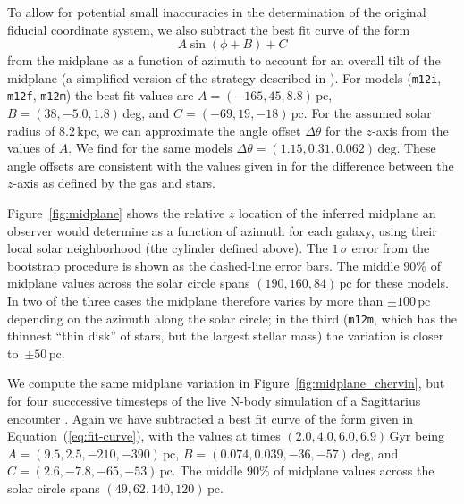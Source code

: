 \documentclass[twocolumn]{aastex62}
\newcommand{\pc}{\text{pc}}
\newcommand{\kpc}{\text{kpc}}
\newcommand{\Gyr}{\text{Gyr}}
\newcommand{\mi}{\texttt{m12i}}
\newcommand{\mf}{\texttt{m12f}}
\newcommand{\mm}{\texttt{m12m}}
\newcommand{\beq}{\begin{equation}}
\newcommand{\eeq}{\end{equation}}
\begin{document}
To allow for potential small inaccuracies in the determination of the original
fiducial coordinate system, we also subtract the best fit curve of the form 
\beq \label{eq:fit-curve}
A \sin{\left(\phi + B\right)} + C 
\eeq 
from the midplane as a
function of azimuth to account for an overall tilt of the midplane (a
simplified version of the strategy described in
\citealt{2019ApJ...871..145A}). 
For models (\mi{}, \mf{}, \mm{}) the best fit values are $A =
(-165, 45, 8.8)\,\pc$, $B = (38, -5.0, 1.8)\,\text{deg}$,
and $C = (-69, 19, -18)\,\pc$.
For the assumed solar radius of $8.2\,\kpc$, we can approximate the
angle offset 
$\Delta \theta$ 
for the $z$-axis from the values of 
$A$. We find for the same models $\Delta \theta = (1.15, 0.31, 0.062)\,\text{deg}$.
These angle offsets are consistent with the
values given in \citet{2018arXiv180610564S} for the difference between the
$z$-axis as defined by the gas and stars.

Figure~\ref{fig:midplane} shows the relative $z$ location of the inferred
midplane an observer would determine as a function of azimuth for
each galaxy, using their local solar neighborhood (the cylinder defined
above). The
$1\,\sigma$ error from the bootstrap procedure is shown as the dashed-line
error bars. The middle $90\%$ of midplane values across the solar circle spans $(190, 160, 84)\,\pc$ for these models.
In two of the three cases
the midplane therefore varies by more than $\pm 100\,\pc$ depending on the
azimuth along the solar circle; in the third (\mm{}, which has the thinnest
``thin disk'' of stars, but the largest stellar mass) the variation is closer
to~$\pm 50\,\pc$.

We compute the same midplane variation in Figure~\ref{fig:midplane_chervin},
but for four succcessive timesteps of the live N-body simulation of a
Sagittarius encounter \citep{2018MNRAS.481..286L}. Again we have subtracted a
best fit curve of the form given in Equation~(\ref{eq:fit-curve}), with the values at times
$(2.0, 4.0, 6.0, 6.9)\,\Gyr$ being $A = (9.5, 2.5, -210,
-390)\,\pc$, $B
= (0.074, 0.039, -36,
-57)\,\text{deg}$, and $C = (2.6,-7.8, -65, -53)\,\pc$.
The middle $90\%$ of midplane values across the solar circle spans 
$(49, 62, 140, 120)\,\pc$.
\end{document}
